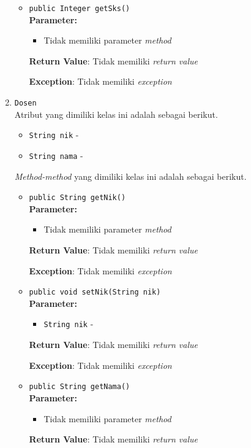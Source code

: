 \documentclass{article}
\begin{document}
\begin{enumerate}
\begin{itemize}
\item \texttt{public Integer getSks()}\\ 


\textbf{Parameter:}\begin{itemize}
\item Tidak memiliki parameter \textit{method}
\end{itemize}
\textbf{Return Value}: Tidak memiliki \textit{return value}

\textbf{Exception}: Tidak memiliki \textit{exception}

\end{itemize}
\item \texttt{Dosen}\\ 


Atribut yang dimiliki kelas ini adalah sebagai berikut.
\begin{itemize}
\item \texttt{String nik} - 
\item \texttt{String nama} - 
\end{itemize}
\textit{Method-method} yang dimiliki kelas ini adalah sebagai berikut.
\begin{itemize}
\item \texttt{public String getNik()}\\ 


\textbf{Parameter:}\begin{itemize}
\item Tidak memiliki parameter \textit{method}
\end{itemize}
\textbf{Return Value}: Tidak memiliki \textit{return value}

\textbf{Exception}: Tidak memiliki \textit{exception}

\item \texttt{public void setNik(String nik)}\\ 


\textbf{Parameter:}\begin{itemize}
\item \texttt{String nik} - 
\end{itemize}
\textbf{Return Value}: Tidak memiliki \textit{return value}

\textbf{Exception}: Tidak memiliki \textit{exception}

\item \texttt{public String getNama()}\\ 


\textbf{Parameter:}\begin{itemize}
\item Tidak memiliki parameter \textit{method}
\end{itemize}
\textbf{Return Value}: Tidak memiliki \textit{return value}


\end{itemize}
\end{enumerate}
\end{document}
